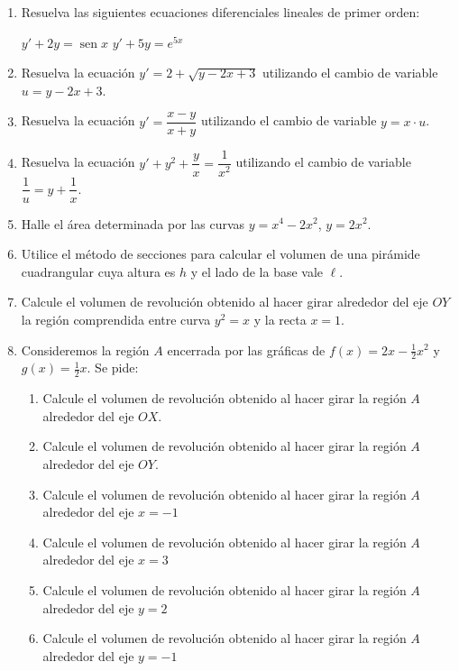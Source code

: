 \begin{enumerate}
\item Resuelva las siguientes ecuaciones diferenciales lineales de primer orden:
\setcontadoralph
\begin{centrar}
\nitem $y'+2y=\operatorname{sen} x$ \hfill
\nitem $y'+5y=e^{5x}$
\end{centrar}

\item
Resuelva la ecuación $y'=2+\sqrt{y-2x+3}$ utilizando el cambio de variable $u=y-2x+3$.

\item
Resuelva la ecuación $y'=\dfrac{x-y}{x+y}$ utilizando el cambio de variable $y=x\cdot u$.


\item
Resuelva la ecuación $y'+y^2+\dfrac{y}{x}=\dfrac{1}{x^2}$ utilizando el cambio de variable $\dfrac1u=y+\dfrac1x$.

\item Halle el área determinada por las curvas $y=x^4-2x^2$, $y=2x^2$.

\item Utilice el método de secciones para calcular el volumen de una pirámide cuadrangular cuya altura es $h$ y el lado de la base vale $\ell$.

\item Calcule el volumen de revolución obtenido al hacer girar alrededor del eje $OY$ la región comprendida entre curva $y^2=x$ y la recta $x=1$.

\item Consideremos la región $A$ encerrada por las gráficas de
$f(x)=2x-\frac{1}{2}x^2$ y $g(x)=\frac{1}{2}x$. Se pide:
\begin{enumerate}
\item Calcule el volumen de revolución obtenido al hacer girar la región $A$ alrededor del eje $OX$.
\item Calcule el volumen de revolución obtenido al hacer girar la región $A$ alrededor del eje $OY$.
\item Calcule el volumen de revolución obtenido al hacer girar la región $A$ alrededor del eje $x=-1$
\item Calcule el volumen de revolución obtenido al hacer girar la región $A$ alrededor del eje $x=3$
\item Calcule el volumen de revolución obtenido al hacer girar la región $A$ alrededor del eje $y=2$
\item Calcule el volumen de revolución obtenido al hacer girar la región $A$ alrededor del eje $y=-1$
\end{enumerate}


\end{enumerate}
